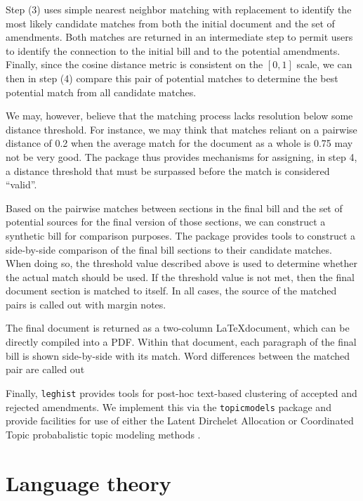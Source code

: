 \documentclass[11pt]{article}
\begin{document}
Step (3) uses simple nearest neighbor matching with replacement to
identify the most likely candidate matches from both the initial
document and the set of amendments. Both matches are returned in an
intermediate step to permit users to identify the connection to the
initial bill and to the potential amendments. Finally, since the cosine distance metric
is consistent on the $[0,1]$ scale, we can then in step (4) compare
this pair of potential matches to determine the best potential match
from all candidate matches. 

We may, however, believe that the matching process lacks resolution
below some distance threshold. For instance, we may think that matches
reliant on a pairwise distance of 0.2 when the average match for the
document as a whole is 0.75 may not be very good. The package thus
provides mechanisms for assigning, in step 4, a distance threshold
that must be surpassed before the match is considered ``valid''. 

Based on the pairwise matches between sections in the final bill and
the set of potential sources for the final version of those sections,
we can construct a synthetic bill for comparison purposes. The package
provides tools to construct a side-by-side comparison of the final
bill sections to their candidate matches. When doing so, the threshold
value described above is used to determine whether the actual match
should be used. If the threshold value is not met, then the final
document section is matched to itself. In all cases, the source of the
matched pairs is called out with margin notes. 

The final document is
returned as a two-column \LaTeX document, which can be directly
compiled into a PDF. Within that document, each paragraph of the final
bill is shown side-by-side with its match. Word differences between
the matched pair are called out 

Finally, \texttt{leghist} provides tools for post-hoc text-based
clustering of accepted and rejected amendments. We implement this via
the \texttt{topicmodels} \citep{grun2011topicmodels} package and provide facilities for use of
either the Latent Dirchelet Allocation or Coordinated Topic
probabalistic topic modeling methods \citep{blei2003latent,blei2006correlated}. 

\section{Language theory}
\label{sec:language-theory}
\end{document}
